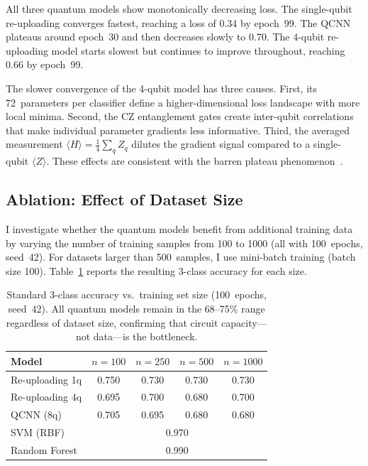 All three quantum models show monotonically decreasing loss. The single-qubit re-uploading converges fastest, reaching a loss of 0.34 by epoch~99. The QCNN plateaus around epoch~30 and then decreases slowly to 0.70. The 4-qubit re-uploading model starts slowest but continues to improve throughout, reaching 0.66 by epoch~99.

The slower convergence of the 4-qubit model has three causes. First, its 72~parameters per classifier define a higher-dimensional loss landscape with more local minima. Second, the CZ entanglement gates create inter-qubit correlations that make individual parameter gradients less informative. Third, the averaged measurement $\langle H \rangle = \frac{1}{4}\sum_q Z_q$ dilutes the gradient signal compared to a single-qubit $\langle Z \rangle$. These effects are consistent with the barren plateau phenomenon~\cite{mcclean2018barren}.

\subsection{Ablation: Effect of Dataset Size}
\label{sec:res_ablation_data}

I investigate whether the quantum models benefit from additional training data by varying the number of training samples from 100 to 1000 (all with 100~epochs, seed~42). For datasets larger than 500~samples, I use mini-batch training (batch size 100). Table~\ref{tab:res_ablation_data} reports the resulting 3-class accuracy for each size.

\begin{table}[ht]
\centering
\begin{tabular}{lcccc}
    \toprule
    \textbf{Model} & $n=100$ & $n=250$ & $n=500$ & $n=1000$ \\
    \midrule
    Re-uploading 1q & 0.750 & 0.730 & 0.730 & 0.730 \\
    Re-uploading 4q & 0.695 & 0.700 & 0.680 & 0.700 \\
    QCNN (8q)       & 0.705 & 0.695 & 0.680 & 0.680 \\
    \midrule
    SVM (RBF)       & \multicolumn{4}{c}{0.970} \\
    Random Forest   & \multicolumn{4}{c}{0.990} \\
    \bottomrule
\end{tabular}
\caption{Standard 3-class accuracy vs.\ training set size (100~epochs, seed~42). All quantum models remain in the 68--75\% range regardless of dataset size, confirming that circuit capacity---not data---is the bottleneck.}
\label{tab:res_ablation_data}
\end{table}

